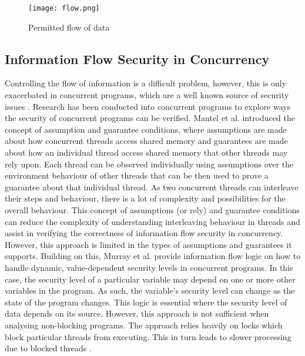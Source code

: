 \begin{figure}
    \texttt{[image: flow.png]}
    \caption{Permitted flow of data}
    \label{fig:flow}
\end{figure}

\subsection{Information Flow Security in Concurrency}
Controlling the flow of information is a difficult problem, however, this is only exacerbated in concurrent programs, which are a well known source of security issues \cite{mantel2014noninterference}\cite{smith2019value}\cite{vaughan2012secure}. Research has been conducted into concurrent programs to explore ways the security of concurrent programs can be verified. Mantel et al. \cite{mantel2011assumptions} introduced the concept of assumption and guarantee conditions, where assumptions are made about how concurrent threads access shared memory and guarantees are made about how an individual thread access shared memory that other threads may rely upon. Each thread can be observed individually using assumptions over the environment behaviour of other threads that can be then used to prove a guarantee about that individual thread. As two concurrent threads can interleave their steps and behaviour, there is a lot of complexity and possibilities for the overall behaviour. This concept of assumptions (or rely) and guarantee conditions can reduce the complexity of understanding interleaving behaviour in threads and assist in verifying the correctness of information flow security in concurrency. However, this approach is limited in the types of assumptions and guarantees it supports. Building on this, Murray et al. \cite{ernst2019seccsl} \cite{murray2018covern} provide information flow logic on how to handle dynamic, value-dependent security levels in concurrent programs. In this case, the security level of a particular variable may depend on one or more other variables in the program. As such, the variable's security level can change as the state of the program changes. This logic is essential where the security level of data depends on its source. However, this approach is not sufficient when analysing non-blocking programs. The approach relies heavily on locks which block particular threads from executing. This in turn leads to slower processing due to blocked threads \cite{prakash1991non}.

